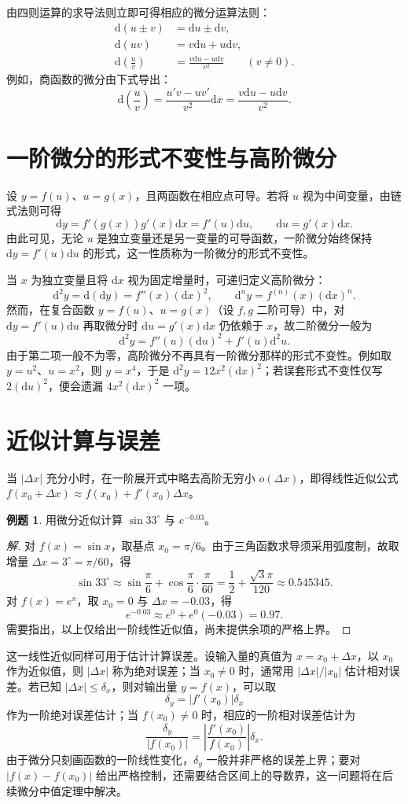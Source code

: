 \documentclass[UTF8,fontset=fandol,a4paper,12pt]{ctexart}
\newcommand{\dd}{\mathrm d}
\theoremstyle{definition}
\newtheorem{example}[definition]{例题}
\begin{document}
由四则运算的求导法则立即可得相应的微分运算法则：
\begin{align*}
 \dd(u\pm v)&=\dd u\pm\dd v,\\
 \dd(uv)&=v\dd u+u\dd v,\\
 \dd\left(\frac uv\right)&=\frac{v\dd u-u\dd v}{v^2}\qquad(v\ne0).
\end{align*}
例如，商函数的微分由下式导出：
\[
 \dd\left(\frac uv\right)
 =\frac{u'v-uv'}{v^2}\dd x
 =\frac{v\dd u-u\dd v}{v^2}.
\]

\section{一阶微分的形式不变性与高阶微分}
设 $y=f(u)$、$u=g(x)$，且两函数在相应点可导。若将 $u$ 视为中间变量，由链式法则可得
\[
 \dd y=f'(g(x))g'(x)\dd x=f'(u)\dd u,
 \qquad \dd u=g'(x)\dd x.
\]
由此可见，无论 $u$ 是独立变量还是另一变量的可导函数，一阶微分始终保持 $\dd y=f'(u)\dd u$ 的形式，这一性质称为一阶微分的形式不变性。

当 $x$ 为独立变量且将 $\dd x$ 视为固定增量时，可递归定义高阶微分：
\[
 \dd^2y=\dd(\dd y)=f''(x)(\dd x)^2,
 \qquad \dd^ny=f^{(n)}(x)(\dd x)^n.
\]
然而，在复合函数 $y=f(u)$、$u=g(x)$（设 $f,g$ 二阶可导）中，对 $\dd y=f'(u)\dd u$ 再取微分时 $\dd u=g'(x)\dd x$ 仍依赖于 $x$，故二阶微分一般为
\[
 \dd^2y=f''(u)(\dd u)^2+f'(u)\dd^2u.
\]
由于第二项一般不为零，高阶微分不再具有一阶微分那样的形式不变性。例如取 $y=u^2$、$u=x^2$，则 $y=x^4$，于是 $\dd^2y=12x^2(\dd x)^2$；若误套形式不变性仅写 $2(\dd u)^2$，便会遗漏 $4x^2(\dd x)^2$ 一项。

\section{近似计算与误差}
当 $|\Delta x|$ 充分小时，在一阶展开式中略去高阶无穷小 $o(\Delta x)$，即得线性近似公式 $f(x_0+\Delta x)\approx f(x_0)+f'(x_0)\Delta x$。

\begin{example}
用微分近似计算 $\sin33^\circ$ 与 $e^{-0.03}$。
\end{example}
\begin{proof}[解]
对 $f(x)=\sin x$，取基点 $x_0=\pi/6$。由于三角函数求导须采用弧度制，故取增量 $\Delta x=3^\circ=\pi/60$，得
\[
 \sin33^\circ\approx\sin\frac\pi6+\cos\frac\pi6\cdot\frac\pi{60}
 =\frac12+\frac{\sqrt3\pi}{120}\approx0.545345.
\]
对 $f(x)=e^x$，取 $x_0=0$ 与 $\Delta x=-0.03$，得
\[
 e^{-0.03}\approx e^0+e^0(-0.03)=0.97.
\]
需要指出，以上仅给出一阶线性近似值，尚未提供余项的严格上界。
\end{proof}

这一线性近似同样可用于估计计算误差。设输入量的真值为 $x=x_0+\Delta x$，以 $x_0$ 作为近似值，则 $|\Delta x|$ 称为绝对误差；当 $x_0\ne0$ 时，通常用 $|\Delta x|/|x_0|$ 估计相对误差。若已知 $|\Delta x|\le\delta_x$，则对输出量 $y=f(x)$，可以取
\[
 \delta_y=|f'(x_0)|\delta_x
\]
作为一阶绝对误差估计；当 $f(x_0)\ne0$ 时，相应的一阶相对误差估计为
\[
 \frac{\delta_y}{|f(x_0)|}
 =\left|\frac{f'(x_0)}{f(x_0)}\right|\delta_x.
\]
由于微分只刻画函数的一阶线性变化，$\delta_y$ 一般并非严格的误差上界；要对 $|f(x)-f(x_0)|$ 给出严格控制，还需要结合区间上的导数界，这一问题将在后续微分中值定理中解决。
\end{document}

